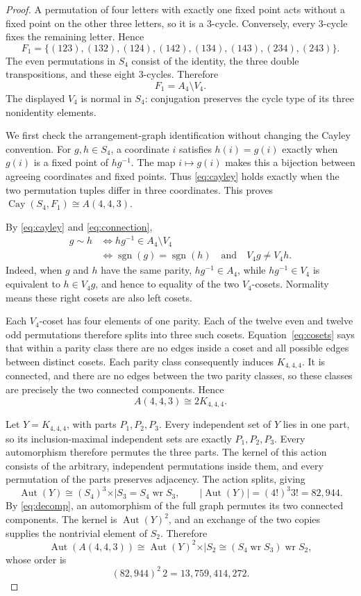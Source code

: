 \documentclass[11pt]{article}
\newcommand{\sdp}{\mathbin{\times\!\!|}}
\newcommand{\wprod}{\mathbin{\operatorname{wr}}}
\DeclareMathOperator{\Aut}{Aut}
\newcommand{\Cay}{\operatorname{Cay}}
\begin{document}
\begin{proof}
A permutation of four letters with exactly one fixed point acts without a
fixed point on the other three letters, so it is a $3$-cycle.  Conversely,
every $3$-cycle fixes the remaining letter.  Hence
\[
 F_1=\{(123),(132),(124),(142),(134),(143),(234),(243)\}.
\]
The even permutations in $S_4$ consist of the identity, the three double
transpositions, and these eight $3$-cycles.  Therefore
\[
 F_1=A_4\setminus V_4. \tag{2}\label{eq:connection}
\]
The displayed $V_4$ is normal in $S_4$: conjugation preserves the cycle
type of its three nonidentity elements.

We first check the arrangement-graph identification without changing the
Cayley convention.  For $g,h\in S_4$, a coordinate $i$ satisfies
$h(i)=g(i)$ exactly when $g(i)$ is a fixed point of $hg^{-1}$.  The map
$i\mapsto g(i)$ makes this a bijection between agreeing coordinates and
fixed points.  Thus \eqref{eq:cayley} holds exactly when the two
permutation tuples differ in three coordinates.  This proves
$\Cay(S_4,F_1)\cong A(4,4,3)$.

By \eqref{eq:cayley} and \eqref{eq:connection},
\begin{align*}
 g\sim h
 &\Longleftrightarrow hg^{-1}\in A_4\setminus V_4\\
 &\Longleftrightarrow
   \operatorname{sgn}(g)=\operatorname{sgn}(h)
   \quad\text{and}\quad V_4g\ne V_4h. \tag{3}\label{eq:cosets}
\end{align*}
Indeed, when $g$ and $h$ have the same parity, $hg^{-1}\in A_4$, while
$hg^{-1}\in V_4$ is equivalent to $h\in V_4g$, and hence to equality of
the two $V_4$-cosets.  Normality means these right cosets are also left
cosets.

Each $V_4$-coset has four elements of one parity.  Each of the twelve
even and twelve odd permutations therefore splits into three such
cosets.  Equation~\eqref{eq:cosets} says that within a parity class there
are no edges inside a coset and all possible edges between distinct
cosets.  Each parity class consequently induces $K_{4,4,4}$.  It is
connected, and there are no edges between the two parity classes, so
these classes are precisely the two connected components.  Hence
\[
 A(4,4,3)\cong 2K_{4,4,4}. \tag{4}\label{eq:decomp}
\]

Let $Y=K_{4,4,4}$, with parts $P_1,P_2,P_3$.  Every independent set of
$Y$ lies in one part, so its inclusion-maximal independent sets are
exactly $P_1,P_2,P_3$.  Every automorphism therefore permutes the three
parts.  The kernel of this action consists of the arbitrary, independent
permutations inside them, and every permutation of the parts preserves
adjacency.  The action splits, giving
\[
 \Aut(Y)\cong (S_4)^3\sdp S_3=S_4\wprod S_3,
 \qquad
 |\Aut(Y)|=(4!)^3 3!=82{,}944. \tag{5}\label{eq:onecomponent}
\]
By \eqref{eq:decomp}, an automorphism of the full graph permutes its two
connected components.  The kernel is $\Aut(Y)^2$, and an exchange of the
two copies supplies the nontrivial element of $S_2$.  Therefore
\[
 \Aut(A(4,4,3))
 \cong \Aut(Y)^2\sdp S_2
 \cong (S_4\wprod S_3)\wprod S_2, \tag{6}
\]
whose order is
\[
 (82{,}944)^2\,2=13{,}759{,}414{,}272. \tag{7}
\]


\end{proof}
\end{document}
